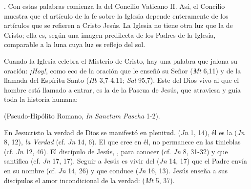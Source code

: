 	 . Con estas palabras comienza la  del Concilio Vaticano II. Así, el Concilio muestra que el artículo de la fe sobre la Iglesia depende enteramente de los artículos que se refieren a Cristo Jesús. La Iglesia no tiene otra luz que la de Cristo; ella es, según una imagen predilecta de los Padres de la Iglesia, comparable a la luna cuya luz es reflejo del sol.
	
	 Cuando la Iglesia celebra el Misterio de Cristo, hay una palabra que jalona su oración: \emph{¡Hoy!}, como eco de la oración que le enseñó su Señor (\emph{Mt} 6,11) y de la llamada del Espíritu Santo (\emph{Hb} 3,7-4,11; \emph{Sal} 95,7). Este  del Dios vivo al que el hombre está llamado a entrar, es la  de la Pascua de Jesús, que atraviesa y guía toda la historia humana:
	
	 (Pseudo-Hipólito Romano, \emph{In Sanctum Pascha} 1-2).
	
	 En Jesucristo la verdad de Dios se manifestó en plenitud.  (\emph{Jn} 1, 14), él es la  (\emph{Jn} 8, 12), \emph{la Verdad} (cf. \emph{Jn} 14, 6). El que cree en él, no permanece en las tinieblas (cf. \emph{Jn} 12, 46). El discípulo de Jesús, , para conocer  (cf. \emph{Jn} 8, 31-32) y que santifica (cf. \emph{Jn} 17, 17). Seguir a Jesús es vivir del  (\emph{Jn} 14, 17) que el Padre envía en su nombre (cf. \emph{Jn} 14, 26) y que conduce  (\emph{Jn} 16, 13). Jesús enseña a sus discípulos el amor incondicional de la verdad:  (\emph{Mt} 5, 37).
	
